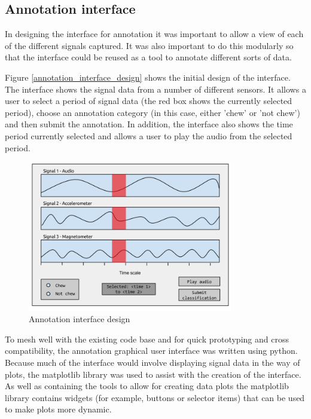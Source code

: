 \subsection{Annotation interface}

In designing the interface for annotation it was important to allow a view of each of the different signals captured. It was also important to do this modularly so that the interface could be reused as a tool to annotate different sorts of data.

Figure \ref{annotation_interface_design} shows the initial design of the interface. The interface shows the signal data from a number of different sensors. It allows a user to select a period of signal data (the red box shows the currently selected period), choose an annotation category (in this case, either 'chew' or 'not chew') and then submit the annotation. In addition, the interface also shows the time period currently selected and allows a user to play the audio from the selected period. 

\begin{figure}[ht!]
\begin{center}
\leavevmode
\includegraphics[width=0.8\textwidth]{images/annotation_interface_design.png}
\end{center}
\caption{Annotation interface design}
\label{annotationinterfacedesign}
\end{figure}

To mesh well with the existing code base and for quick prototyping and cross compatibility, the annotation graphical user interface was written using python. Because much of the interface would involve displaying signal data in the way of plots, the matplotlib library was used to assist with the creation of the interface. As well as containing the tools to allow for creating data plots the matplotlib library contains widgets (for example, buttons or selector items) that can be used to make plots more dynamic. 

